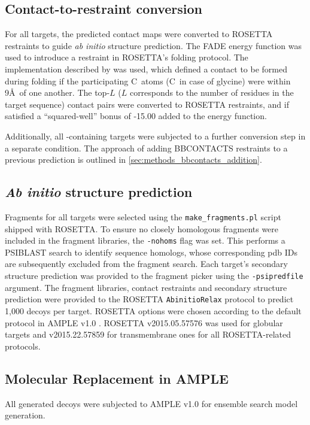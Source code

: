 \subsection{Contact-to-restraint conversion} \label{sec:bbcontacts_addition}
For all targets, the predicted contact maps were converted to ROSETTA restraints to guide \textit{ab initio} structure prediction. The FADE energy function was used to introduce a restraint in ROSETTA's folding protocol. The implementation described by \textcite{Michel2014-eg} was used, which defined a contact to be formed during folding if the participating C\textbeta\ atoms (C\textalpha\ in case of glycine) were within 9\AA\ of one another. The top-$L$ ($L$ corresponds to the number of residues in the target sequence) contact pairs were converted to ROSETTA restraints, and if satisfied a ``squared-well'' bonus of -15.00 added to the energy function.

Additionally, all \textbeta-containing targets were subjected to a further conversion step in a separate condition. The approach of adding BBCONTACTS restraints to a previous prediction is outlined in \cref{sec:methods_bbcontacts_addition}.

\subsection{\textit{Ab initio} structure prediction}
Fragments for all targets were selected using the \texttt{make\_fragments.pl} script shipped with ROSETTA. To ensure no closely homologous fragments were included in the fragment libraries, the \texttt{-nohoms} flag was set. This performs a PSIBLAST search to identify sequence homologs, whose corresponding \gls{pdb} IDs are subsequently excluded from the fragment search. Each target's secondary structure prediction was provided to the fragment picker using the \texttt{-psipredfile} argument. The fragment libraries, contact restraints and secondary structure prediction were provided to the ROSETTA \texttt{AbinitioRelax} protocol \cite{Rohl2004-dj} to predict 1,000 decoys per target. ROSETTA options were chosen according to the default protocol in AMPLE v1.0 \cite{Bibby2012-lm}. ROSETTA v2015.05.57576 was used for globular targets and v2015.22.57859 for transmembrane ones for all ROSETTA-related protocols.
 
\subsection{Molecular Replacement in AMPLE}
All generated decoys were subjected to AMPLE v1.0 \cite{Bibby2012-lm} for ensemble search model generation. 

